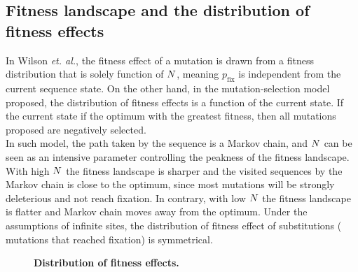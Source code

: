 \subsection{Fitness landscape and the distribution of fitness effects}
In Wilson \textit{et. al.}, the fitness effect of a mutation is drawn from a fitness distribution that is solely function of $N$, meaning ${p_{\mathrm{fix}}}$ is independent from the current sequence state.
On the other hand, in the mutation-selection model proposed, the distribution of fitness effects is a function of the current state.
If the current state if the optimum with the greatest fitness, then all mutations proposed are negatively selected.\\
In such model, the path taken by the sequence is a Markov chain, and $N$ can be seen as an intensive parameter controlling the peakness of the fitness landscape. With high $N$ the fitness landscape is sharper and the visited sequences by the Markov chain is close to the optimum, since most mutations will be strongly deleterious and not reach fixation. In contrary, with low $N$ the fitness landscape is flatter and Markov chain moves away from the optimum.
Under the assumptions of infinite sites, the distribution of fitness effect of substitutions ( mutations that reached fixation) is symmetrical.
\begin{figure}[thbp]
	\centering
	\caption{\textbf{Distribution of fitness effects.}}
\end{figure}

